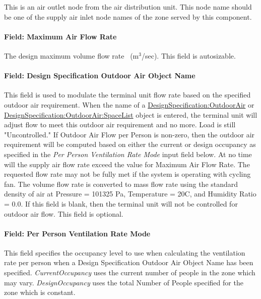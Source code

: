 This is an air outlet node from the air distribution unit. This node name should be one of the supply air inlet node names of the zone served by this component.

\paragraph{Field: Maximum Air Flow Rate}\label{field-maximum-air-flow-rate-1}

The design maximum volume flow rate~ (m\(^{3}\)/sec). This field is autosizable.

\paragraph{Field: Design Specification Outdoor Air Object Name}

This field is used to modulate the terminal unit flow rate based on the specified outdoor air requirement. When the name of a \hyperref[designspecificationoutdoorair]{DesignSpecification:OutdoorAir} or \hyperref[designspecificationoutdoorairspacelist]{DesignSpecification:OutdoorAir:SpaceList} object is entered, the terminal unit will adjust flow to meet this outdoor air requirement and no more. Load is still "Uncontrolled." If Outdoor Air Flow per Person is non-zero, then the outdoor air requirement will be computed based on either the current or design occupancy as specified in the \textit{Per Person Ventilation Rate Mode} input field below. At no time will the supply air flow rate exceed the value for Maximum Air Flow Rate. The requested flow rate may not be fully met if the system is operating with cycling fan. The volume flow rate is converted to mass flow rate using the standard density of air at Pressure = 101325 Pa, Temperature = 20C, and Humidity Ratio = 0.0. If this field is blank, then the terminal unit will not be controlled for outdoor air flow. This field is optional.

\paragraph{Field: Per Person Ventilation Rate Mode}\label{field-per-person-ventilation-rate-mode}

This field specifies the occupancy level to use when calculating the ventilation rate per person when a Design Specification Outdoor Air Object Name has been specified. \textit{CurrentOccupancy} uses the current number of people in the zone which may vary. \textit{DesignOccupancy} uses the total Number of People specified for the zone which is constant.

